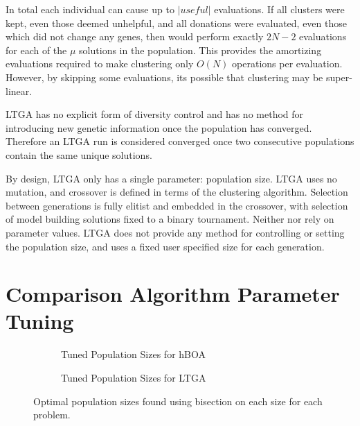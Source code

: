 In total each individual can cause up to $|useful|$ evaluations. If all clusters were kept, even those deemed
unhelpful, and all donations were evaluated, even those which did not change any genes, then 
would perform exactly $2N-2$ evaluations for each of the $\mu$ solutions in the population. This provides the amortizing evaluations
required to make clustering only $O(N)$ operations per evaluation. However, by skipping some evaluations, its
possible that clustering may be super-linear.

LTGA has no explicit form of diversity control and has no method for introducing new genetic information once
the population has converged. Therefore an LTGA run is considered converged once two consecutive populations
contain the same unique solutions.

By design, LTGA only has a single parameter: population size. LTGA uses no mutation, and crossover is defined
in terms of the clustering algorithm. Selection between generations is fully elitist and embedded in the crossover,
with selection of model building solutions fixed to a binary tournament. Neither  nor
 rely on parameter values. LTGA does not provide any method for controlling or setting
the population size, and uses a fixed user specified size for each generation.

\section{Comparison Algorithm Parameter Tuning}
\label{sec-tuning}

\begin{figure}[t]
  \begin{centering}
    \begin{subfigure}{.5\textwidth}
      \begin{centering}
      \end{centering}
      \caption{Tuned Population Sizes for hBOA}
      \label{fig-pop-hboa}
    \end{subfigure}%
    \begin{subfigure}{.5\textwidth}
      \begin{centering}
      \end{centering}
      \caption{Tuned Population Sizes for LTGA}
      \label{fig-pop-ltga}
    \end{subfigure}
  \end{centering}
  \caption{Optimal population sizes found using bisection on each size
           for each problem.}
  \label{fig-pop-sizes}
\end{figure}


